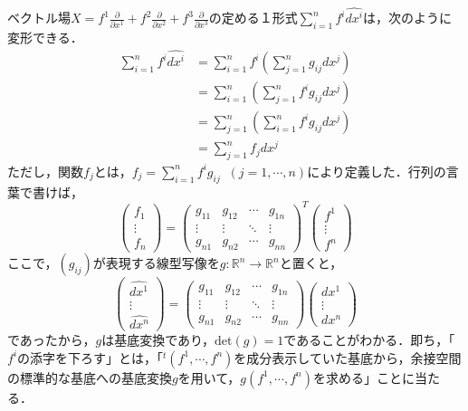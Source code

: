 \documentclass[uplatex, dvipdfmx]{jsreport}
\begin{document}
\begin{definition}[ベクトル場の定める1-形式]
    ベクトル場$X=f^1\frac{\partial}{\partial x^1}+f^2\frac{\partial}{\partial x^2}+f^3\frac{\partial}{\partial x^3}$の定める１形式$\sum^n_{i=1}f^i\widehat{dx^i}$は，次のように変形できる．
    \begin{align*}
        \sum^n_{i=1}f^i\widehat{dx^i} &= \sum^n_{i=1}f^i\left( \sum^n_{j=1}g_{ij}dx^j \right) \\
        &= \sum^n_{i=1}\left( \sum^n_{j=1}f^ig_{ij}dx^j \right) \\
        &= \sum^n_{j=1}\left( \sum^n_{i=1}f^ig_{ij}dx^j \right) \\
        &= \sum^n_{j=1}f_jdx^j
    \end{align*}
    ただし，関数$f_j$とは，$f_j=\sum^n_{i=1}f^ig_{ij}\;\;(j=1,\cdots,n)$により定義した．行列の言葉で書けば，
    \[ \begin{pmatrix}f_1\\\vdots\\f_n\end{pmatrix} = \begin{pmatrix}g_{11}&g_{12}&\cdots&g_{1n}\\\vdots&\vdots&\ddots&\vdots\\g_{n1}&g_{n2}&\cdots&g_{nn}\end{pmatrix}^T\begin{pmatrix}f^1\\\vdots\\f^n\end{pmatrix} \]
    ここで，$(g_{ij})$が表現する線型写像を$g:\mathbb{R}^n\to\mathbb{R}^n$と置くと，
    \[\begin{pmatrix}\widehat{dx^1}\\\vdots\\\widehat{dx^n}\end{pmatrix}=\begin{pmatrix}g_{11}&g_{12}&\cdots&g_{1n}\\\vdots&\vdots&\ddots&\vdots\\g_{n1}&g_{n2}&\cdots&g_{nn}\end{pmatrix}\begin{pmatrix}dx^1\\\vdots\\dx^n\end{pmatrix}\]
    であったから，$g$は基底変換であり，$\mathrm{det}(g)=1$であることがわかる．即ち，「$f^i$の添字を下ろす」とは，「${}^t(f^1,\cdots,f^n)$を成分表示していた基底から，余接空間の標準的な基底への基底変換$g$を用いて，$g(f^1,\cdots,f^n)$を求める」ことに当たる．

\end{definition}
\end{document}

